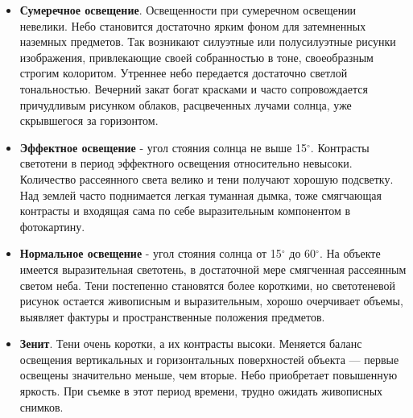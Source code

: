 \documentclass{article}
\begin{document}
\begin{itemize}
\item \textbf{Сумеречное освещение}. Освещенности при сумеречном освещении невелики. Небо становится достаточно ярким фоном для затемненных наземных предметов. Так возникают силуэтные или полусилуэтные рисунки изображения, привлекающие своей собранностью в тоне, своеобразным строгим колоритом. Утреннее небо передается достаточно светлой тональностью. Вечерний закат богат красками и часто сопровождается причудливым рисунком облаков, расцвеченных лучами солнца, уже скрывшегося за горизонтом.
\item \textbf{Эффектное освещение} - угол стояния солнца не выше 15$^{\circ}$. Контрасты светотени в период эффектного освещения относительно невысоки. Количество рассеянного света велико и тени получают хорошую подсветку. Над землей часто поднимается легкая туманная дымка, тоже смягчающая контрасты и входящая сама по себе выразительным компонентом в фотокартину.
\item \textbf{Нормальное освещение} - угол стояния солнца от 15$^{\circ}$ до 60$^{\circ}$. На объекте имеется выразительная светотень, в достаточной мере смягченная рассеянным светом неба. Тени постепенно становятся более короткими, но светотеневой рисунок остается живописным и выразительным, хорошо очерчивает объемы, выявляет фактуры и пространственные положения предметов.
\item \textbf{Зенит}. Тени очень коротки, а их контрасты высоки. Меняется баланс освещения вертикальных и горизонтальных поверхностей объекта --- первые освещены значительно меньше, чем вторые. Небо приобретает повышенную яркость. При съемке в этот период времени, трудно ожидать живописных снимков.
\end{itemize}
\end{document}
